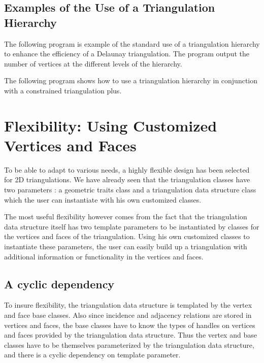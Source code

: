 \subsection{Examples of the Use of a  Triangulation Hierarchy\label{Subsection_2D_Triangulations_Hierarchy_Examples}}

The following program is example
of the  standard use of a  triangulation hierarchy
to enhance the efficiency
of a Delaunay triangulation. The program output the number of vertices
at the different levels of the hierarchy.

The following program shows how to use
a triangulation hierarchy in conjunction with a constrained 
triangulation plus.

\section{Flexibility: Using  Customized Vertices and Faces\label{Section_2D_Triangulations_Flexibility}}


To be able to adapt to  various needs, a highly
flexible design has been  selected for 2D triangulations.
We have already seen that
the triangulation classes have two
parameters : a geometric traits class
and a triangulation data structure  class
which the user can instantiate with his own customized classes.

The most useful flexibility however comes from the fact
that the triangulation data structure itself has two template
parameters to be instantiated by 
classes for the vertices and faces of the triangulation.
Using his own customized classes to instantiate these
parameters, the user can easily build up  a triangulation with additional
information or functionality in the vertices and faces.

\subsection*{A cyclic dependency}

To insure flexibility, the triangulation data structure is templated by the
vertex and face base classes. Also since incidence and adjacency
relations are stored in vertices and faces, the base classes have to
know the types of handles on vertices and faces provided
by the triangulation data structure. Thus the vertex and base
classes have to be themselves parameterized by the triangulation data
structure, and there is a cyclic dependency on template parameter.

